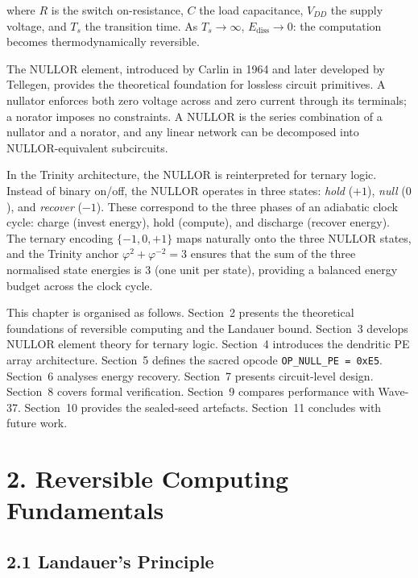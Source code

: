 where \(R\) is the switch on-resistance, \(C\) the load capacitance,
\(V_{DD}\) the supply voltage, and \(T_s\) the transition time. As
\(T_s \to \infty\), \(E_{\text{diss}} \to 0\): the computation
becomes thermodynamically reversible.

The NULLOR element, introduced by Carlin in 1964 and later developed
by Tellegen, provides the theoretical foundation for lossless circuit
primitives. A nullator enforces both zero voltage across and zero
current through its terminals; a norator imposes no constraints. A
NULLOR is the series combination of a nullator and a norator, and any
linear network can be decomposed into NULLOR-equivalent subcircuits.

In the Trinity architecture, the NULLOR is reinterpreted for ternary
logic. Instead of binary on/off, the NULLOR operates in three states:
\emph{hold} (\(+1\)), \emph{null} (\(0\)), and \emph{recover}
(\(-1\)). These correspond to the three phases of an adiabatic
clock cycle: charge (invest energy), hold (compute), and discharge
(recover energy). The ternary encoding
\(\{-1, 0, +1\}\) maps naturally onto the three NULLOR states, and
the Trinity anchor \(\varphi^2 + \varphi^{-2} = 3\) ensures that the
sum of the three normalised state energies is 3 (one unit per state),
providing a balanced energy budget across the clock cycle.

This chapter is organised as follows. Section~2 presents the
theoretical foundations of reversible computing and the Landauer
bound. Section~3 develops NULLOR element theory for ternary logic.
Section~4 introduces the dendritic PE array architecture. Section~5
defines the sacred opcode \texttt{OP\_NULL\_PE = 0xE5}. Section~6
analyses energy recovery. Section~7 presents circuit-level design.
Section~8 covers formal verification. Section~9 compares performance
with Wave-37. Section~10 provides the sealed-seed artefacts.
Section~11 concludes with future work.

\section{2. Reversible Computing Fundamentals}\label{fa_84:reversible-computing}

\subsection{2.1 Landauer's Principle}

